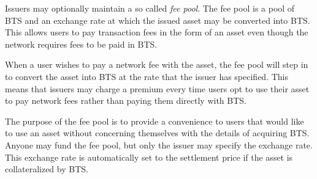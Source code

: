 \label{seq:feepool}

Issuers may optionally maintain a so called \emph{fee pool}. The fee pool is a
pool of BTS and an exchange rate at which the issued asset may be converted
into BTS. This allows users to pay transaction fees in the form of an asset
even though the network requires fees to be paid in BTS.

When a user wishes to pay a network fee with the asset, the fee pool will step
in to convert the asset into BTS at the rate that the issuer has specified.
This means that issuers may charge a premium every time users opt to use their
asset to pay network fees rather than paying them directly with BTS.

The purpose of the fee pool is to provide a convenience to users that would
like to use an asset without concerning themselves with the details of
acquiring BTS. Anyone may fund the fee pool, but only the issuer may specify
the exchange rate. This exchange rate is automatically set to the settlement
price if the asset is collateralized by BTS.
